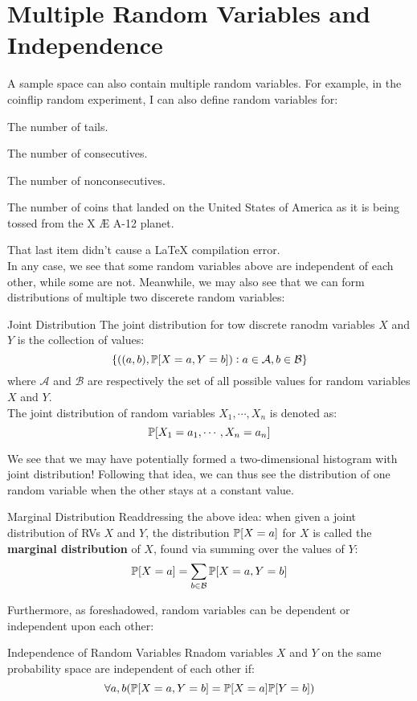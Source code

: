 \section{Multiple Random Variables and Independence}
A sample space can also contain multiple random variables. For example, in the coinflip random experiment, I can also define random variables for: 
\begin{bindenum}
    \item The number of tails.
    \item The number of consecutives.
    \item The number of nonconsecutives.
    \item The number of coins that landed on the United States of America as it is being tossed from the X Æ A-12 planet.
\end{bindenum}
That last item didn't cause a LaTeX compilation error. \\
In any case, we see that some random variables above are independent of each other, while some are not. Meanwhile, we may also see that we can form distributions of multiple two discerete random variables:
\begin{ln-define}{Joint Distribution}{}
    The joint distribution for tow discrete ranodm variables $X$ and $Y$ is the collection of values:
    \[\{((a, b), \P[X = a, Y = b]) : a \in \mathcal{A}, b \in \mathcal{B}\}\]
    where $\mathcal{A}$ and $\mathcal{B}$ are respectively the set of all possible values for random variables $X$ and $Y$. \\
    The joint distribution of random variables $X_1, \cdots, X_n$ is denoted as:
    \[\P[X_1 = a_1, \cdots, X_n = a_n]\]
\end{ln-define}
We see that we may have potentially formed a two-dimensional histogram with joint distribution! Following that idea, we can thus see the distribution of one random variable when the other stays at a constant value.
\begin{ln-define}{Marginal Distribution}{}
    Readdressing the above idea: when given a joint distribution of RVs $X$ and $Y$, the distribution $\P[X = a]$ for $X$ is called the \textbf{marginal distribution} of $X$, found via summing over the values of $Y$:
    \[\P[X = a] = \sum_{b \in \mathcal{B}} \P[X = a, Y = b]\]
\end{ln-define}
Furthermore, as foreshadowed, random variables can be dependent or independent upon each other:
\begin{ln-define}{Independence of Random Variables}{}
    Rnadom variables $X$ and $Y$ on the same probability space are independent of each other if:
    \[\forall a,b (\P[X = a, Y = b] = \P[X = a] \P[Y = b])\]
\end{ln-define}

